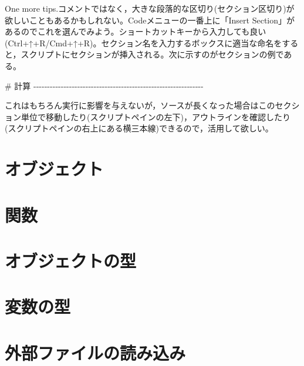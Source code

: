 \documentclass[
  a4paper,
]{ltjsbook}
\newenvironment{Shaded}{\begin{snugshade}}{\end{snugshade}}
\newcommand{\CommentTok}[1]{\textcolor[rgb]{0.37,0.37,0.37}{#1}}
\begin{document}
One more
tips.コメントではなく，大きな段落的な区切り(セクション区切り)が欲しいこともあるかもしれない。Codeメニューの一番上に「Insert
Section」があるのでこれを選んでみよう。ショートカットキーから入力しても良い(Ctrl+↑+R/Cmd+↑+R)。セクション名を入力するボックスに適当な命名をすると，スクリプトにセクションが挿入される。次に示すのがセクションの例である。

\begin{Shaded}
\begin{Highlighting}[]
\CommentTok{\# 計算 {-}{-}{-}{-}{-}{-}{-}{-}{-}{-}{-}{-}{-}{-}{-}{-}{-}{-}{-}{-}{-}{-}{-}{-}{-}{-}{-}{-}{-}{-}{-}{-}{-}{-}{-}{-}{-}{-}{-}{-}{-}{-}{-}{-}{-}{-}{-}{-}{-}{-}{-}{-}{-}{-}{-}{-}{-}{-}{-}{-}{-}{-}}
\end{Highlighting}
\end{Shaded}

これはもちろん実行に影響を与えないが，ソースが長くなった場合はこのセクション単位で移動したり(スクリプトペインの左下)，アウトラインを確認したり(スクリプトペインの右上にある横三本線)できるので，活用して欲しい。

\hypertarget{ux30aaux30d6ux30b8ux30a7ux30afux30c8}{%
\section{オブジェクト}\label{ux30aaux30d6ux30b8ux30a7ux30afux30c8}}

\hypertarget{ux95a2ux6570}{%
\section{関数}\label{ux95a2ux6570}}

\hypertarget{ux30aaux30d6ux30b8ux30a7ux30afux30c8ux306eux578b}{%
\section{オブジェクトの型}\label{ux30aaux30d6ux30b8ux30a7ux30afux30c8ux306eux578b}}

\hypertarget{ux5909ux6570ux306eux578b}{%
\section{変数の型}\label{ux5909ux6570ux306eux578b}}

\hypertarget{ux5916ux90e8ux30d5ux30a1ux30a4ux30ebux306eux8aadux307fux8fbcux307f}{%
\section{外部ファイルの読み込み}\label{ux5916ux90e8ux30d5ux30a1ux30a4ux30ebux306eux8aadux307fux8fbcux307f}}
\end{document}
